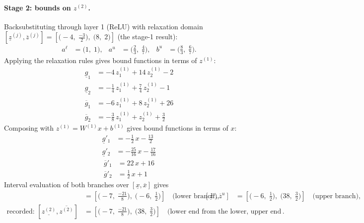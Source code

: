 \documentclass[11pt]{article}
\begin{document}
\paragraph{Stage 2: bounds on $z^{(2)}$.}
Backsubstituting through layer 1 (ReLU) with relaxation domain $[\underline{z}^{(j)}, \overline{z}^{(j)}] = [\bigl(-4,\; \frac{-3}{2}\bigr),\; \bigl(8,\; 2\bigr)]$ (the stage-1 result):
\begin{align*}
a^{\ell} &= \bigl(1,\; 1\bigr), & a^{u} &= \bigl(\frac{2}{3},\; \frac{4}{7}\bigr), & b^{u} &= \bigl(\frac{8}{3},\; \frac{6}{7}\bigr).
\end{align*}
Applying the relaxation rules gives bound functions in terms of $z^{(1)}$:
\begin{align*}
\underline{g}_{1} &= -4\,z^{(1)}_{1} + 14\,z^{(1)}_{2} - 2 \\
\underline{g}_{2} &= -\frac{1}{4}\,z^{(1)}_{1} + \frac{7}{4}\,z^{(1)}_{2} - 1
\end{align*}
\begin{align*}
\overline{g}_{1} &= -6\,z^{(1)}_{1} + 8\,z^{(1)}_{2} + 26 \\
\overline{g}_{2} &= -\frac{3}{8}\,z^{(1)}_{1} + z^{(1)}_{2} + \frac{3}{2}
\end{align*}
Composing with $z^{(1)} = W^{(1)} x + b^{(1)}$ gives bound functions in terms of $x$:
\begin{align*}
\underline{g}'_{1} &= -\frac{1}{2}\,x - \frac{13}{2} \\
\underline{g}'_{2} &= -\frac{25}{16}\,x - \frac{17}{16}
\end{align*}
\begin{align*}
\overline{g}'_{1} &= 22\,x + 16 \\
\overline{g}'_{2} &= \frac{1}{2}\,x + 1
\end{align*}
Interval evaluation of both branches over $[\underline{x}, \overline{x}]$ gives
\begin{align*}
[\underline{z}^{\ell}, \overline{z}^{\ell}] &= [\bigl(-7,\; \frac{-21}{8}\bigr),\; \bigl(-6,\; \frac{1}{2}\bigr)] \quad\text{(lower branch)}, & [\underline{z}^{u}, \overline{z}^{u}] &= [\bigl(-6,\; \frac{1}{2}\bigr),\; \bigl(38,\; \frac{3}{2}\bigr)] \quad\text{(upper branch)}, \\
\text{recorded: } [\underline{z^{(2)}}, \overline{z^{(2)}}] &= [\bigl(-7,\; \frac{-21}{8}\bigr),\; \bigl(38,\; \frac{3}{2}\bigr)] \quad\text{(lower end from the lower, upper end from the upper branch)}.
\end{align*}
\end{document}
